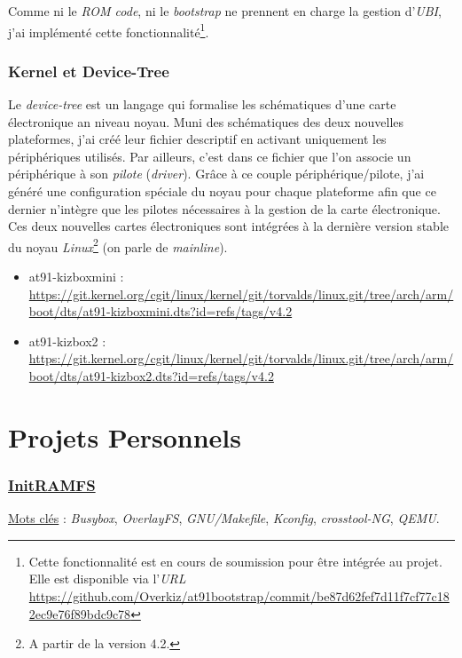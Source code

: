 \documentclass[a4paper]{article}
\begin{document}
Comme ni le \textit{ROM code}, ni le \textit{bootstrap} ne prennent en charge la gestion d'\textit{UBI}, j'ai implémenté cette fonctionnalité\footnote{Cette fonctionnalité est en cours de soumission pour être intégrée au projet. Elle est disponible via l'\textit{URL} \url{https://github.com/Overkiz/at91bootstrap/commit/be87d62fef7d11f7cf77c182ec9e76f89bdc9c78}}.

\section{Kernel et Device-Tree}

Le \textit{device-tree} est un langage qui formalise les schématiques d'une carte électronique an niveau noyau. Muni des schématiques des deux nouvelles plateformes, j'ai créé leur fichier descriptif en activant uniquement les périphériques utilisés. Par ailleurs, c'est dans ce fichier que l'on associe un périphérique à son \textit{pilote} (\textit{driver}). Grâce à ce couple périphérique/pilote, j'ai généré une configuration spéciale du noyau pour chaque plateforme afin que ce dernier n’intègre que les pilotes nécessaires à la gestion de la carte électronique.\\

Ces deux nouvelles cartes électroniques sont intégrées à la dernière version stable du noyau \textit{Linux}\footnote{A partir de la version 4.2.} (on parle de \textit{mainline}).
\begin{itemize}
\item at91-kizboxmini : \url{https://git.kernel.org/cgit/linux/kernel/git/torvalds/linux.git/tree/arch/arm/boot/dts/at91-kizboxmini.dts?id=refs/tags/v4.2}
\item at91-kizbox2 : \url{https://git.kernel.org/cgit/linux/kernel/git/torvalds/linux.git/tree/arch/arm/boot/dts/at91-kizbox2.dts?id=refs/tags/v4.2}
\end{itemize}
\clearpage

\part{Projets Personnels}

\section{\href{https://github.com/gportay/initramfs/}{InitRAMFS}}

\underline{Mots clés} : \textit{Busybox}, \textit{OverlayFS}, \textit{GNU/Makefile}, \textit{Kconfig}, \textit{crosstool-NG}, \textit{QEMU}.\\
\end{document}
